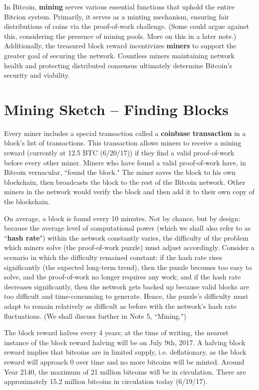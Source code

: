 \documentclass[11pt]{article}
\begin{document}
    In Bitcoin, \textbf{mining} serves various essential functions that uphold the entire Bitcion system. Primarily, it serves as a minting mechanism, ensuring fair distributions of coins via the proof-of-work challenge. (Some could argue against this, considering the presence of mining pools. More on this in a later note.) Additionally, the treasured block reward incentivizes \textbf{miners} to support the greater goal of securing the network. Countless miners maintaining network health and protecting distributed consensus ultimately determine Bitcoin's security and viability.
    
    \section*{Mining Sketch -- Finding Blocks}
    
    Every miner includes a special transaction called a \textbf{coinbase transaction} in a block's list of transactions. This transaction allows miners to receive a mining reward \big(currently at 12.5 BTC (6/20/17)\big) if they find a valid proof-of-work before every other miner. Miners who have found a valid proof-of-work have, in Bitcoin vernacular, ``found the block." The miner saves the block to his own blockchain, then broadcasts the block to the rest of the Bitcoin network. Other miners in the network would verify the block and then add it to their own copy of the blockchain.
    
    On average, a block is found every 10 minutes. Not by chance, but by design: because the average level of computational power (which we shall also refer to as ``\textbf{hash rate}") within the network constantly varies, the difficulty of the problem which miners solve (the proof-of-work puzzle) must adjust accordingly. Consider a scenario in which the difficulty remained constant: if the hash rate rises significantly (the expected long-term trend), then the puzzle becomes too easy to solve, and the proof-of-work no longer requires any work; and if the hash rate decreases significantly, then the network gets backed up because valid blocks are too difficult and time-consuming to generate. Hence, the puzzle's difficulty must adapt to remain relatively as difficult as before with the network's hash rate fluctuations. (We shall discuss further in Note 5, ``Mining.") 
    
    The block reward halves every 4 years; at the time of writing, the nearest instance of the block reward halving will be on July 9th, 2017. A halving block reward implies that bitcoins are in limited supply, i.e. deflationary, as the block reward will approach 0 over time and no more bitcoins will be minted. Around Year 2140, the maximum of 21 million bitcoins will be in circulation. There are approximately 15.2 million bitcoins in circulation today (6/19/17).
    
\end{document}
